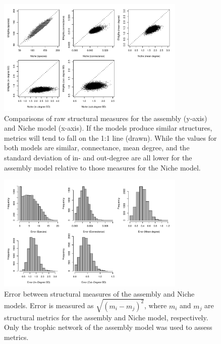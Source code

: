 \documentclass[twocolumn,preprintnumbers,amsmath,amssymb,superscriptaddress,linenumbers]{revtex4-1}
\begin{document}
\begin{figure}[h!]
\centering
\includegraphics[width=0.8\textwidth]{fig_errorscatter2.pdf}
\caption{
Comparisons of raw structural measures for the assembly (y-axis) and Niche model (x-axis).
If the models produce similar structures, metrics will tend to fall on the 1:1 line (drawn).
While the values for both models are similar, connectance, mean degree, and the standard deviation of in- and out-degree are all lower for the assembly model relative to those measures for the Niche model.
}
\label{fig:error1}
\end{figure}

\begin{figure}[h!]
\centering
\includegraphics[width=0.8\textwidth]{fig_error2.pdf}
\caption{
Error between structural measures of the assembly and Niche models.
Error is measured as $\sqrt{(m_i - m_j)^2}$, where $m_i$ and $m_j$ are structural metrics for the assembly and Niche model, respectively.
Only the trophic network of the assembly model was used to assess metrics.
}
\label{fig:error2}
\end{figure}
\end{document}
